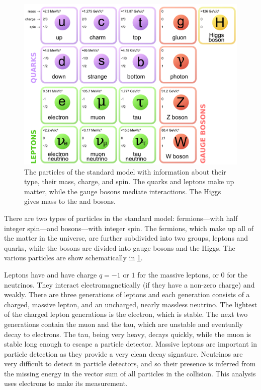 \begin{figure}[!htbp]
    \centering
    \includegraphics[width=\textwidth]{figures/standard_model.pdf}
    \caption[
        The particles of the standard model.
    ]{
        The particles of the standard model with information about their
        type, their mass, charge, and spin. The quarks and leptons make up
        matter, while the gauge bosons mediate interactions. The Higgs gives
        mass to the \W and \Z bosons.
    }
    \label{fig:standard_model}
\end{figure}

There are two types of particles in the standard model: fermions---with half
integer spin---and bosons---with integer spin. The fermions, which make up all
of the matter in the universe, are further subdivided into two groups, leptons
and quarks, while the bosons are divided into gauge bosons and the Higgs.  The
various particles are show schematically in \cref{fig:standard_model}.

Leptons have \spinhalf and have charge $q=-1 \text{ or } 1$ for the massive
leptons, or 0 for the neutrinos. They interact electromagnetically (if they
have a non-zero charge) and weakly. There are three generations of leptons and
each generation consists of a charged, massive lepton, and an uncharged, nearly
massless neutrino. The lightest of the charged lepton generations is the
electron, which is stable. The next two generations contain the muon and the
tau, which are unstable and eventually decay to electrons. The tau, being very
heavy, decays quickly, while the muon is stable long enough to escape a
particle detector. Massive leptons are important in particle detection as they
provide a very clean decay signature. Neutrinos are very difficult to detect in
particle detectors, and so their presence is inferred from the missing energy
in the vector sum of all particles in the collision. This analysis uses
electrons to make its measurement.

